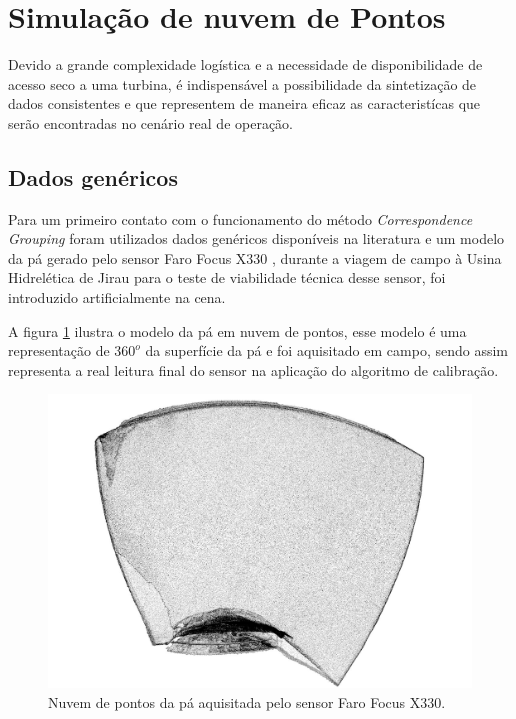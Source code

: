 \section{Simulação de nuvem de Pontos}

Devido a grande complexidade logística e a necessidade de disponibilidade de
acesso seco a uma turbina, é indispensável a possibilidade da sintetização de
dados consistentes e que representem de maneira eficaz as caracteristícas que
serão encontradas no cenário real de operação. 

\subsection{Dados genéricos}

Para um primeiro contato com o funcionamento do método \textit{Correspondence
Grouping} foram utilizados dados genéricos disponíveis na literatura
\footnotemark {}
e um modelo da pá gerado pelo sensor Faro Focus X330 , durante a viagem de campo
à Usina Hidrelética de Jirau para o teste de viabilidade técnica desse sensor, foi
introduzido artificialmente na cena.

A figura \ref{fig::modelo_pa_faro} ilustra o modelo da pá em nuvem de pontos,
esse modelo é uma representação de $360^o$ da superfície da pá e foi aquisitado em
campo, sendo assim representa a real leitura final do sensor na aplicação do
algoritmo de calibração.

\begin{figure}[h!]
	\centering
	\includegraphics[width=0.9\columnwidth]{figs/calibracao/modelo_pa_faro}
	\caption{Nuvem de pontos da pá aquisitada pelo sensor Faro Focus X330.}
    \label{fig::modelo_pa_faro}
\end{figure}

